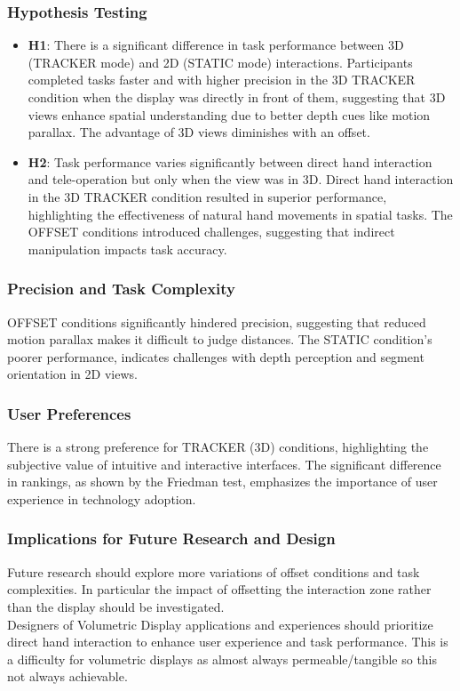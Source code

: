 \subsubsection{Hypothesis Testing}
\begin{itemize}
	\item \textbf{H1}: There is a significant difference in task performance between 3D (TRACKER mode) and 2D (STATIC mode) interactions. Participants completed tasks faster and with higher precision in the 3D TRACKER condition when the display was directly in front of them, suggesting that 3D views enhance spatial understanding due to better depth cues like motion parallax. The advantage of 3D views diminishes with an offset.\\
	\item \textbf{H2}: Task performance varies significantly between direct hand interaction and tele-operation but only when the view was in 3D. Direct hand interaction in the 3D TRACKER condition resulted in superior performance, highlighting the effectiveness of natural hand movements in spatial tasks. The OFFSET conditions introduced challenges, suggesting that indirect manipulation impacts task accuracy.
\end{itemize}

\subsubsection{Precision and Task Complexity}
OFFSET conditions significantly hindered precision, suggesting that reduced motion parallax makes it difficult to judge distances. The STATIC condition's poorer performance, indicates challenges with depth perception and segment orientation in 2D views. 

\subsubsection{User Preferences}
There is a strong preference for TRACKER (3D) conditions, highlighting the subjective value of intuitive and interactive interfaces. The significant difference in rankings, as shown by the Friedman test, emphasizes the importance of user experience in technology adoption.

\subsubsection{Implications for Future Research and Design}
Future research should explore more variations of offset conditions and task complexities. In particular the impact of offsetting the interaction zone rather than the display should be investigated.  \\

Designers of Volumetric Display applications and experiences should prioritize direct hand interaction to enhance user experience and task performance. This is a difficulty for volumetric displays as almost always permeable/tangible so this not always achievable. \\